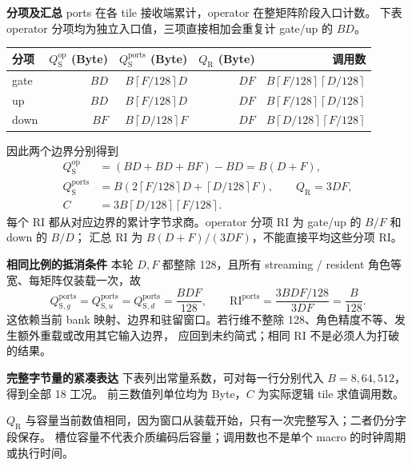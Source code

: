 \documentclass[11pt,a4paper,fontset=fandol]{ctexart}
\newcommand{\qs}{Q_{\mathrm S}}
\newcommand{\qr}{Q_{\mathrm R}}
\newcommand{\RI}{\mathrm{RI}}
\newcommand{\op}{\mathrm{op}}
\newcommand{\loc}{\mathrm{ports}}
\newcommand{\cn}[1]{\left\lceil #1/128\right\rceil}
\newcommand{\para}[1]{\par\smallskip\noindent\textbf{#1}\quad}
\begin{document}
\para{分项及汇总}
ports 在各 tile 接收端累计，operator 在整矩阵阶段入口计数。
下表 operator 分项均为独立入口值，三项直接相加会重复计 gate/up 的 $BD$。
\begin{center}\small
\begin{tabular}{@{}lrrrr@{}}\toprule
分项 & $\qs^\op$ (Byte) & $\qs^\loc$ (Byte) & $\qr$ (Byte) & 调用数\\\midrule
gate & $BD$ & $B\cn{F}D$ & $DF$ & $B\cn{F}\cn{D}$\\
up & $BD$ & $B\cn{F}D$ & $DF$ & $B\cn{F}\cn{D}$\\
down & $BF$ & $B\cn{D}F$ & $DF$ & $B\cn{D}\cn{F}$\\\bottomrule
\end{tabular}
\end{center}
因此两个边界分别得到
\begin{align}
\qs^\op &= (BD+BD+BF)-BD=B(D+F),\\
\qs^\loc &=B\left(2\cn{F}D+\cn{D}F\right),\qquad \qr=3DF,\\
C &=3B\cn{D}\cn{F}.
\end{align}
每个 RI 都从对应边界的累计字节求商。operator 分项 RI 为 gate/up 的 $B/F$ 和 down 的 $B/D$；
汇总 RI 为 $B(D+F)/(3DF)$，不能直接平均这些分项 RI。

\para{相同比例的抵消条件}
本轮 $D,F$ 都整除 128，且所有 streaming / resident 角色等宽、每矩阵仅装载一次，故
\begin{equation}
Q_{\mathrm S,g}^\loc=Q_{\mathrm S,u}^\loc=Q_{\mathrm S,d}^\loc=\frac{BDF}{128},\qquad
\RI^\loc=\frac{3BDF/128}{3DF}=\frac{B}{128}.
\end{equation}
这依赖当前 bank 映射、边界和驻留窗口。若行维不整除 128、角色精度不等、发生额外重载或改用其它输入边界，
应回到未约简式；相同 RI 不是必须人为打破的结果。

\para{完整字节量的紧凑表达}
下表列出常量系数，可对每一行分别代入 $B=8,64,512$，得到全部 18 工况。
前三数值列单位均为 Byte，$C$ 为实际逻辑 tile 求值调用数。
\begin{center}\small

\end{center}
$\qr$ 与容量当前数值相同，因为窗口从装载开始，只有一次完整写入；二者仍分字段保存。
槽位容量不代表介质编码后容量；调用数也不是单个 macro 的时钟周期或执行时间。

\clearpage
\end{document}
